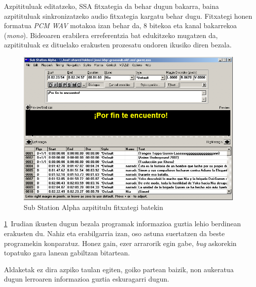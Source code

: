 Azpitituluak editatzeko, SSA fitxategia da behar dugun bakarra, baina azpitituluak sinkronizatzeko audio fitxategia kargatu behar dugu. Fitxategi honen formatua \textit{PCM WAV} motakoa izan behar da, 8 bitekoa eta kanal bakarrekoa (\textit{mono}). Bideoaren erabilera erreferentzia bat edukitzeko mugatzen da, azpitituluak ez dituelako erakusten prozesatu ondoren ikusiko diren bezala.
\begin{figure}[htb]
\begin{center}
\includegraphics[width=\columnwidth, natwidth=789pt, natheight=540pt]{Pictures/Chapter2/ssa-script.png}
\caption{Sub Station Alpha azpititulu fitxategi batekin}
\label{ssa-script}
\end{center}
\end{figure}

\ref{ssa-script}~Irudian ikusten dugun bezala programak informazioa guztia lehio berdinean erakusten du. Nahiz eta erabilgarria izan, oso astuna suertatzen da beste programekin konparatuz. Honez gain, ezer arrarorik egin gabe, \textit{bug} askorekin topatuko gara lanean gabiltzan bitartean.

Aldaketak ez dira azpiko taulan egiten, goiko partean baizik, non aukeratua dugun lerroaren informazioa guztia eskuragarri dugun.

